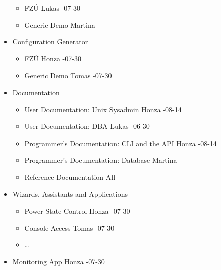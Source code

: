 \documentclass{article}
\begin{document}
\begin{itemize}
        \begin{itemize}
            \item FZÚ \tab Lukas -07-30
            \item Generic Demo \tab Martina
        \end{itemize}
    \item Configuration Generator
        \begin{itemize}
            \item FZÚ \tab Honza -07-30
            \item Generic Demo \tab Tomas -07-30
        \end{itemize}
    \item Documentation
        \begin{itemize}
            \item User Documentation: Unix Sysadmin \tab Honza -08-14
            \item User Documentation: DBA \tab Lukas -06-30
            \item Programmer's Documentation: CLI and the API \tab Honza -08-14
            \item Programmer's Documentation: Database \tab Martina
            \item Reference Documentation \tab All
        \end{itemize}
    \item Wizards, Assistants and Applications
        \begin{itemize}
            \item Power State Control \tab Honza -07-30
            \item Console Access \tab Tomas -07-30
            \item \ldots
        \end{itemize}
    \item Monitoring App \tab Honza -07-30
\end{itemize}
\end{document}

